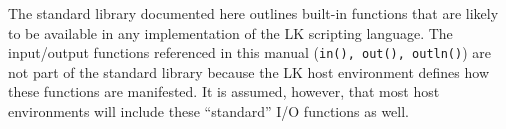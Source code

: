 \documentclass{article}
\begin{document}
The standard library documented here outlines built-in functions that are likely to be available in any implementation of the LK scripting language.  The input/output functions referenced in this manual (\texttt{in(), out(), outln()}) are not part of the standard library because the LK host environment defines how these functions are manifested.  It is assumed, however, that most host environments will include these ``standard'' I/O functions as well.








\end{document}

